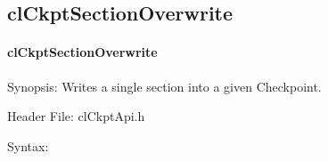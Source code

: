 \begin{flushleft}
\subsection{clCkptSectionOverwrite}
\hypertarget{pageckpt117}{}\paragraph{cl\-Ckpt\-Section\-Overwrite}\label{pageckpt117}
\begin{Desc}
\item[Synopsis:]Writes a single section into a given Checkpoint.\end{Desc}
\begin{Desc}
\item[Header File:]clCkptApi.h\end{Desc}
\begin{Desc}
\item[Syntax:]


\end{Desc}
\end{flushleft}
